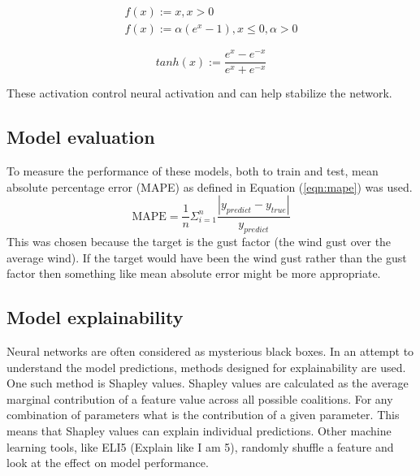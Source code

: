\begin{align}
    \label{eqn:elu}
    f(x) := x, x > 0\\
    f(x) := \alpha (e^x-1), x\leq 0, \alpha > 0
\end{align}

\begin{equation}
    \label{eqn:tanh}
    tanh(x):=\frac{e^x-e^{-x}}{e^x+e^{-x}}
\end{equation}

These activation control neural activation and can help stabilize the network.

\subsection{Model evaluation}
 To measure the performance of these models, both to train and test, mean absolute percentage error (MAPE) as defined in Equation (\ref{eqn:mape}) was used.
\begin{equation}
    \label{eqn:mape}
    \text{MAPE} = \frac{1}{n}\Sigma_{i=1}^n\frac{|y_{predict} - y_{true}|}{y_{predict}}
\end{equation}
This was chosen because the target is the gust factor (the wind gust over the average wind). If the target would have been the wind gust rather than the gust factor then something like mean absolute error might be more appropriate.

\subsection{Model explainability}
Neural networks are often considered as mysterious black boxes\cite{nn_black_box}. In an attempt to understand the model predictions, methods designed for explainability are used. One such method is Shapley values\cite{shapley_information}. Shapley values are calculated as the average marginal contribution of a feature value across all possible coalitions. For any combination of parameters what is the contribution of a given parameter. This means that Shapley values can explain individual predictions. Other machine learning tools, like ELI5 (Explain like I am 5), randomly shuffle a feature and look at the effect on model performance\cite{eli5_information}.